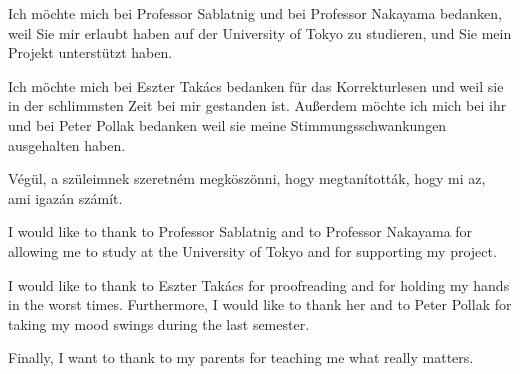 \documentclass[draft,final]{vutinfth} %
\begin{document}
\frontmatter %

\addstatementpage

\begin{danksagung*}
\par
Ich möchte mich bei Professor Sablatnig und bei Professor Nakayama bedanken, weil Sie mir erlaubt haben auf der University of Tokyo zu studieren, und Sie mein Projekt unterstützt haben.
\par
Ich möchte mich bei Eszter Takács bedanken für das Korrekturlesen und weil sie in der schlimmsten Zeit bei mir gestanden ist.
Außerdem möchte ich mich bei ihr und bei Peter Pollak bedanken weil sie meine Stimmungsschwankungen ausgehalten haben.
\par
Végül, a szüleimnek szeretném megköszönni, hogy megtanították, hogy mi az, ami igazán számít.
\end{danksagung*}

\begin{acknowledgements*}
\par
I would like to thank to Professor Sablatnig and to Professor  Nakayama for allowing me to study at the University of Tokyo and for supporting my project.
\par
I would like to thank to Eszter Takács for proofreading and for holding my hands in the worst times.
Furthermore, I would like to thank her and to Peter Pollak for taking my mood swings during the last semester.
\par
Finally, I want to thank to my parents for teaching me what really matters.
\end{acknowledgements*}
\end{document}
